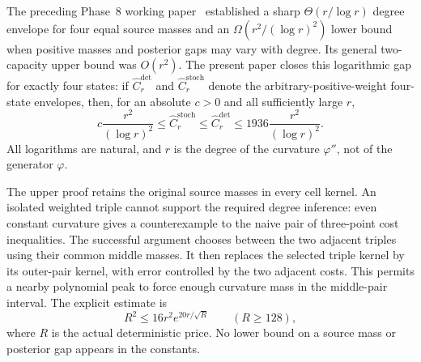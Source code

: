 \documentclass[11pt]{article}
\theoremstyle{definition}\newtheorem{definition}[theorem]{Definition}
\theoremstyle{remark}\newtheorem{remark}[theorem]{Remark}
\newcommand{\detp}{\mathrm{det}}
\newcommand{\stp}{\mathrm{stoch}}
\begin{document}
The preceding Phase~8 working paper~\cite{huang8} established a sharp
$\Theta(r/\log r)$ degree envelope for four equal source masses and an
$\Omega(r^2/(\log r)^2)$ lower bound when positive masses and posterior gaps
may vary with degree. Its general two-capacity upper bound was $O(r^2)$.
The present paper closes this logarithmic gap for exactly four states:
if $\widehat C_r^{\detp}$ and $\widehat C_r^{\stp}$ denote the
arbitrary-positive-weight four-state envelopes, then, for an absolute
$c>0$ and all sufficiently large $r$,
\begin{equation}
 c\frac{r^2}{(\log r)^2}
 \le \widehat C_r^{\stp}\le\widehat C_r^{\detp}
 \le1936\frac{r^2}{(\log r)^2}.
 \label{eq:main-envelope}
\end{equation}
All logarithms are natural, and $r$ is the degree of the curvature
$\varphi''$, not of the generator $\varphi$.

The upper proof retains the original source masses in every cell kernel.
An isolated weighted triple cannot support the required degree inference:
even constant curvature gives a counterexample to the naive pair of
three-point cost inequalities. The successful argument chooses between
the two adjacent triples using their common middle masses. It then replaces
the selected triple kernel by its outer-pair kernel, with error controlled
by the two adjacent costs. This permits a nearby polynomial peak to force
enough curvature mass in the middle-pair interval. The explicit estimate is
\[
 R^2\le16r^2e^{20r/\sqrt R}\qquad(R\ge128),
\]
where $R$ is the actual deterministic price. No lower bound on a source
mass or posterior gap appears in the constants.
\end{document}
